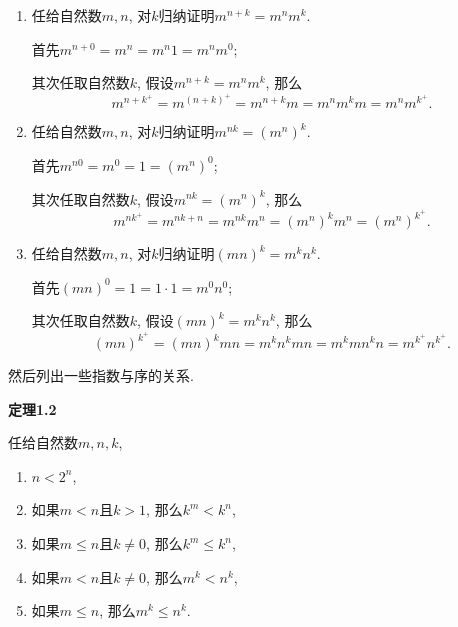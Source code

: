 \documentclass[UTF8]{ctexart}
\begin{document}
\begin{enumerate}
    \item 任给自然数$m,n$, 对$k$归纳证明$m^{n+k}=m^nm^k$.
    
    \hspace{2.17em}
    首先$m^{n+0}=m^n=m^n1=m^nm^0$;
    
    \hspace{2.17em}
    其次任取自然数$k$, 假设$m^{n+k}=m^nm^k$, 那么
    \[
        m^{n+k^+}=m^{(n+k)^+}=m^{n+k}m=m^nm^km=m^nm^{k^+}.
    \]

    \item 任给自然数$m,n$, 对$k$归纳证明$m^{nk}=(m^n)^k$.
    
    \hspace{2.17em}
    首先$m^{n0}=m^0=1=(m^n)^0$;
    
    \hspace{2.17em}
    其次任取自然数$k$, 假设$m^{nk}=(m^n)^k$, 那么
    \[
        m^{nk^+}=m^{nk+n}=m^{nk}m^n=(m^n)^km^n=(m^n)^{k^+}.
    \]

    \item 任给自然数$m,n$, 对$k$归纳证明$(mn)^k=m^kn^k$.
    
    \hspace{2.17em}
    首先$(mn)^0=1=1\cdot 1=m^0n^0$;
    
    \hspace{2.17em}
    其次任取自然数$k$, 假设$(mn)^k=m^kn^k$, 那么
    \begin{equation*}
        (mn)^{k^+}=(mn)^kmn=m^kn^kmn=m^kmn^kn=m^{k^+}n^{k^+}.
    \tag*{\qedsymbol}\end{equation*}
\end{enumerate}





\newpage

然后列出一些指数与序的关系.

\vspace{10pt}

\hypertarget{sec:定理1.2}{}
\noindent\textbf{定理1.2}

任给自然数$m,n,k$,
\begin{enumerate}
    \item $n<2^n$,
    \item 如果$m<n$且$k>1$, 那么$k^m<k^n$,
    \item 如果$m\leqslant n$且$k\neq 0$, 那么$k^m\leqslant k^n$,
    \item 如果$m<n$且$k\neq 0$, 那么$m^k<n^k$,
    \item 如果$m\leqslant n$, 那么$m^k\leqslant n^k$.
\end{enumerate}
\end{document}
